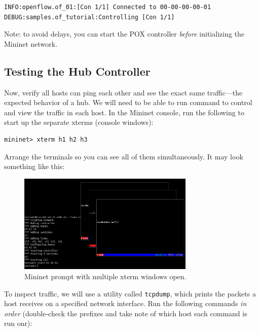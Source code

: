 \documentclass{article}
\begin{document}
\begin{topbot}
\begin{verbatim}
INFO:openflow.of_01:[Con 1/1] Connected to 00-00-00-00-01
DEBUG:samples.of_tutorial:Controlling [Con 1/1]
\end{verbatim}
\end{topbot}

Note: to avoid delays, you can start the POX controller \textit{before} initializing the Mininet network.

\subsection{Testing the Hub Controller}

Now, verify all hosts can ping each other and see the exact same traffic---the expected behavior of a hub.
We will need to be able to run command to control and view the traffic in each host.
In the Mininet console, run the following to start up the separate xterms (console windows):

\begin{topbot}
\begin{verbatim}
mininet> xterm h1 h2 h3
\end{verbatim}
\end{topbot}

\pagebreak
\noindent
Arrange the terminals so you can see all of them simultaneously.
It may look something like this:

\begin{figure}[H]
    \centering
    \includegraphics[width=0.75\textwidth]{img/3_xterms.png}
    \caption{Mininet prompt with multiple xterm windows open.}
    \label{fig:3_xterms}
\end{figure}

To inspect traffic, we will use a utility called \texttt{tcpdump}, which prints the packets a host receives on a specified network interface.
Run the following commands \textit{in order} (double-check the prefixes and take note of which host each command is run onr):
\end{document}
